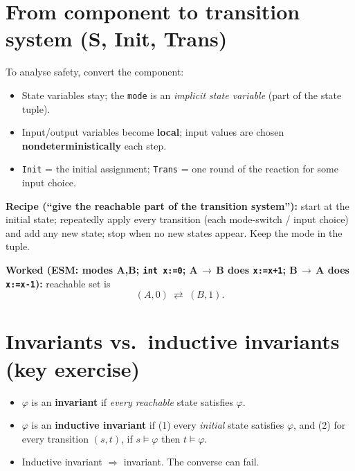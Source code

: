 \section{From component to transition system (S, Init, Trans)}

To analyse safety, convert the component:
\begin{itemize}
  \item State variables stay; the \texttt{mode} is an \emph{implicit state variable}
        (part of the state tuple).
  \item Input/output variables become \textbf{local}; input values are chosen
        \textbf{nondeterministically} each step.
  \item \texttt{Init} = the initial assignment; \texttt{Trans} = one round of the
        reaction for some input choice.
\end{itemize}

\textbf{Recipe (``give the reachable part of the transition system''):}
start at the initial state; repeatedly apply every transition (each mode-switch /
input choice) and add any new state; stop when no new states appear. Keep the mode
in the tuple.

\textbf{Worked (ESM: modes A,B; \texttt{int x:=0}; A$\,\to\,$B does \texttt{x:=x+1};
B$\,\to\,$A does \texttt{x:=x-1}):} reachable set is
\[
(A,0)\ \rightleftarrows\ (B,1).
\]

\section{Invariants vs.\ inductive invariants (key exercise)}

\begin{keybox}
\begin{itemize}
  \item $\varphi$ is an \textbf{invariant} if \emph{every reachable} state satisfies $\varphi$.
  \item $\varphi$ is an \textbf{inductive invariant} if (1) every \emph{initial} state satisfies $\varphi$, and (2) for every transition $(s,t)$, if $s\models\varphi$ then $t\models\varphi$.
  \item Inductive invariant $\Rightarrow$ invariant. The converse can fail.
\end{itemize}
\end{keybox}

